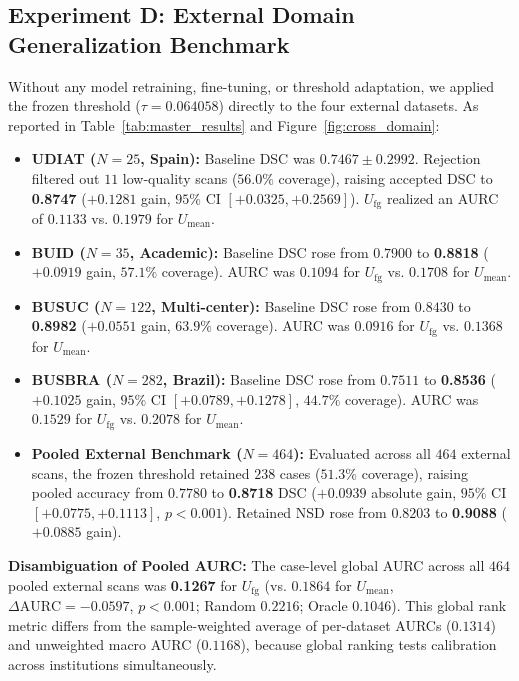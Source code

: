 \documentclass[10pt,journal,compsoc]{IEEEtran}
\begin{document}
\subsection{Experiment D: External Domain Generalization Benchmark}
Without any model retraining, fine-tuning, or threshold adaptation, we applied the frozen threshold ($\tau = 0.064058$) directly to the four external datasets. As reported in Table~\ref{tab:master_results} and Figure~\ref{fig:cross_domain}:
\begin{itemize}
    \item \textbf{UDIAT ($N=25$, Spain):} Baseline DSC was $0.7467 \pm 0.2992$. Rejection filtered out $11$ low-quality scans ($56.0\%$ coverage), raising accepted DSC to \textbf{0.8747} ($+0.1281$ gain, $95\%$ CI $[+0.0325, +0.2569]$). $U_{\mathrm{fg}}$ realized an AURC of $0.1133$ vs. $0.1979$ for $U_{\mathrm{mean}}$.
    \item \textbf{BUID ($N=35$, Academic):} Baseline DSC rose from $0.7900$ to \textbf{0.8818} ($+0.0919$ gain, $57.1\%$ coverage). AURC was $0.1094$ for $U_{\mathrm{fg}}$ vs. $0.1708$ for $U_{\mathrm{mean}}$.
    \item \textbf{BUSUC ($N=122$, Multi-center):} Baseline DSC rose from $0.8430$ to \textbf{0.8982} ($+0.0551$ gain, $63.9\%$ coverage). AURC was $0.0916$ for $U_{\mathrm{fg}}$ vs. $0.1368$ for $U_{\mathrm{mean}}$.
    \item \textbf{BUSBRA ($N=282$, Brazil):} Baseline DSC rose from $0.7511$ to \textbf{0.8536} ($+0.1025$ gain, $95\%$ CI $[+0.0789, +0.1278]$, $44.7\%$ coverage). AURC was $0.1529$ for $U_{\mathrm{fg}}$ vs. $0.2078$ for $U_{\mathrm{mean}}$.
    \item \textbf{Pooled External Benchmark ($N=464$):} Evaluated across all $464$ external scans, the frozen threshold retained $238$ cases ($51.3\%$ coverage), raising pooled accuracy from $0.7780$ to \textbf{0.8718} DSC ($+0.0939$ absolute gain, $95\%$ CI $[+0.0775, +0.1113]$, $p < 0.001$). Retained NSD rose from $0.8203$ to \textbf{0.9088} ($+0.0885$ gain).
\end{itemize}

\textbf{Disambiguation of Pooled AURC:} The case-level global AURC across all $464$ pooled external scans was \textbf{0.1267} for $U_{\mathrm{fg}}$ (vs. $0.1864$ for $U_{\mathrm{mean}}$, $\Delta\mathrm{AURC} = -0.0597$, $p < 0.001$; Random $0.2216$; Oracle $0.1046$). This global rank metric differs from the sample-weighted average of per-dataset AURCs ($0.1314$) and unweighted macro AURC ($0.1168$), because global ranking tests calibration across institutions simultaneously.
\end{document}
